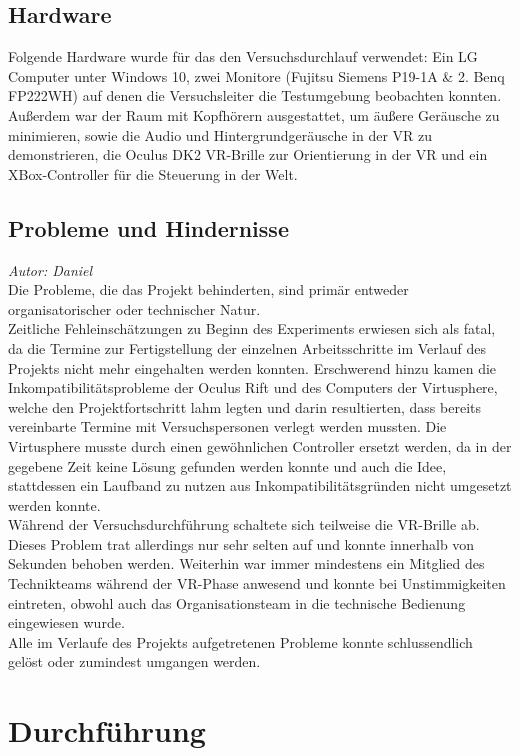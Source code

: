 \documentclass{Bericht}
\begin{document}
\subsection{Hardware}
\label{subsec:hardware}
Folgende Hardware wurde für das den Versuchsdurchlauf verwendet: Ein LG Computer unter Windows 10, zwei Monitore (Fujitsu Siemens P19-1A \& 2. Benq FP222WH) auf denen die Versuchsleiter die Testumgebung beobachten konnten. Außerdem war der Raum mit Kopfhörern ausgestattet, um äußere Geräusche zu minimieren, sowie die Audio und Hintergrundgeräusche in der VR zu demonstrieren, die Oculus DK2 VR-Brille zur Orientierung in der VR und ein XBox-Controller für die Steuerung in der Welt.

\subsection{Probleme und Hindernisse}
\textit{Autor: Daniel}\\
Die Probleme, die das Projekt behinderten, sind primär entweder organisatorischer oder technischer Natur.\\
Zeitliche Fehleinschätzungen zu Beginn des Experiments erwiesen sich als fatal, da die Termine zur Fertigstellung der einzelnen Arbeitsschritte im Verlauf des Projekts nicht mehr eingehalten werden konnten.
Erschwerend hinzu kamen die Inkompatibilitätsprobleme der Oculus Rift und des Computers der Virtusphere, welche den Projektfortschritt lahm legten und darin resultierten, dass bereits vereinbarte Termine mit Versuchspersonen verlegt werden mussten. Die Virtusphere musste durch einen gewöhnlichen Controller ersetzt werden, da in der gegebene Zeit keine Lösung gefunden werden konnte und auch die Idee, stattdessen ein Laufband zu nutzen aus Inkompatibilitätsgründen nicht umgesetzt werden konnte.\\
	Während der Versuchsdurchführung schaltete sich teilweise die VR-Brille ab. Dieses Problem trat allerdings nur sehr selten auf und konnte innerhalb von Sekunden behoben werden. Weiterhin war immer mindestens ein Mitglied des Technikteams während der VR-Phase anwesend und konnte bei Unstimmigkeiten eintreten, obwohl auch das Organisationsteam in die technische Bedienung eingewiesen wurde.\\
	Alle im Verlaufe des Projekts aufgetretenen Probleme konnte schlussendlich gelöst oder zumindest umgangen werden.

\section{Durchführung}
\end{document}
